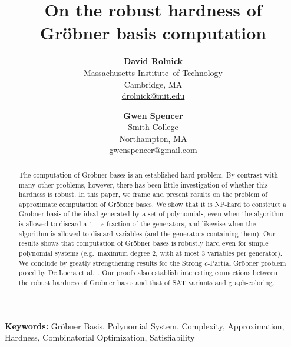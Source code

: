 \documentclass{article}
\newcommand{\ep}[0]{\epsilon}
\begin{document}
\title{\textbf{On the robust hardness of \\
Gr\"{o}bner basis computation}}







\author{
\textbf{David Rolnick}\\
       Massachusetts Institute~of Technology\\
       Cambridge, MA\\
       \url{drolnick@mit.edu}\\
\and
\textbf{Gwen Spencer}\\
       Smith College\\
       Northampton, MA\\
       \url{gwenspencer@gmail.com}
}
\date{}

\maketitle
\begin{abstract}
The computation of Gr\"obner bases is an established hard problem. By contrast with many other problems, however, there has been little investigation of whether this hardness is robust.  In this paper, we frame and present results on the problem of approximate computation of Gr\"obner bases. We show that it is NP-hard to construct a Gr\"obner basis of the ideal generated by a set of polynomials, even when the algorithm is allowed to discard a $1 - \ep$ fraction of the generators, and likewise when the algorithm is allowed to discard variables (and the generators containing them). Our results shows that computation of Gr\"obner bases is robustly hard even for simple polynomial systems (e.g.~maximum degree 2, with at most 3 variables per generator). We conclude by greatly strengthening results for the Strong $c$\nobreakdash-Partial Gr\"obner problem posed by De Loera et al.~\cite{deloera}. Our proofs also establish interesting connections between the robust hardness of Gr\"obner bases and that of SAT variants and graph-coloring.
\end{abstract}









\noindent\textbf{Keywords:} Gr\"{o}bner Basis, Polynomial System, Complexity, Approximation, Hardness, Combinatorial Optimization, Satisfiability\\
\end{document}
